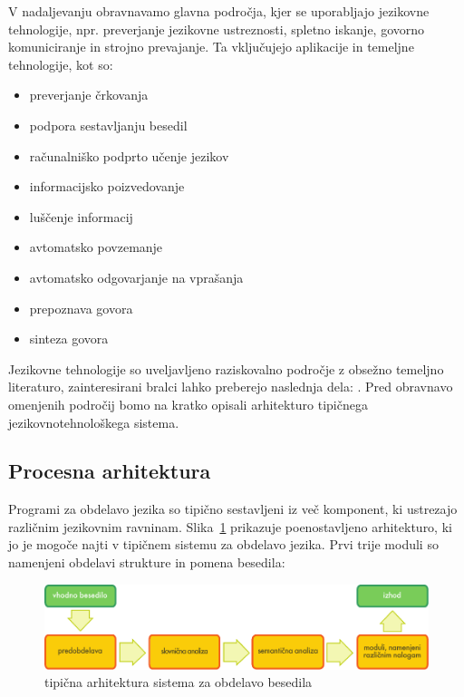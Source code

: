 \begin{multicols}{2}
V nadaljevanju obravnavamo glavna področja, kjer se uporab\-ljajo jezikovne tehnologije, npr. preverjanje jezikovne ustreznosti, spletno iskanje, go\-vorno komuniciranje in stroj\-no prevajanje. Ta vključujejo aplikacije in temeljne tehnologije, kot so:

\begin{itemize}
\item preverjanje črkovanja
\item podpora sestavljanju besedil
\item računalniško podprto učenje jezikov
\item informacijsko poizvedovanje
\item luščenje informacij
\item avtomatsko povzemanje
\item avtomatsko odgovarjanje na vprašanja
\item prepoznava govora
\item sinteza govora
\end{itemize}

Jezikovne tehnologije so uveljav\-ljeno raziskovalno področje z obsežno temeljno literaturo, zainteresirani bralci lahko preberejo naslednja dela: \cite{carstensen-etal1, jurafsky-martin01, manning-schuetze1, lt-world1, lt-survey1}. Pred obravnavo omenjenih področij bomo na kratko opisali arhitekturo tipičnega jezikovnotehnološkega sistema.

\subsection{Procesna arhitektura}

Programi za obdelavo jezika so tipično sestav\-ljeni iz več komponent, ki ustrezajo različnim jezikovnim ravninam. Slika~\ref{fig:textprocessingarch_de} prikazuje poenostav\-ljeno arhitekturo, ki jo je mogoče najti v tipičnem sistemu za obdelavo jezika. Prvi trije moduli so namenjeni obdelavi strukture in pomena besedila:

\begin{figure}[hb]
  \center
  \includegraphics[width=\textwidth]{../_media/slovene/text_processing_app_architecture}
  \caption{tipična arhitektura sistema za obdelavo besedila}
  \label{fig:textprocessingarch_de}
\end{figure}


\end{multicols}
